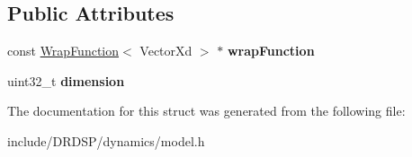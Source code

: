\subsection*{Public Attributes}
\begin{DoxyCompactItemize}
\item 
\hypertarget{struct_d_r_d_s_p_1_1_model_a286bbeaa673d5e756b1b4e97bdab30f6}{const \hyperlink{struct_d_r_d_s_p_1_1_wrap_function}{Wrap\-Function}$<$ Vector\-Xd $>$ $\ast$ {\bfseries wrap\-Function}}\label{struct_d_r_d_s_p_1_1_model_a286bbeaa673d5e756b1b4e97bdab30f6}

\item 
\hypertarget{struct_d_r_d_s_p_1_1_model_af1e4d4ae5a0dec4460845a58dbd312e9}{uint32\-\_\-t {\bfseries dimension}}\label{struct_d_r_d_s_p_1_1_model_af1e4d4ae5a0dec4460845a58dbd312e9}

\end{DoxyCompactItemize}


The documentation for this struct was generated from the following file\-:\begin{DoxyCompactItemize}
\item 
include/\-D\-R\-D\-S\-P/dynamics/model.\-h\end{DoxyCompactItemize}
